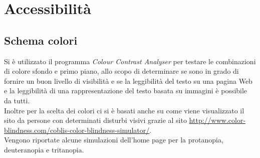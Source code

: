 \section{Accessibilità}
	\subsection{Schema colori}
	Si è utilizzato il programma \emph{Colour Contrast Analyser} per testare le combinazioni di colore sfondo e primo piano, allo scopo di determinare se sono in grado di fornire un buon livello di visibilità e se la leggibilità del testo su una pagina Web e la leggibilità di una rappresentazione del testo basata su immagini è possibile da tutti.\\
	Inoltre per la scelta dei colori ci si è basati anche su come viene visualizzato il sito da persone con determinati disturbi visivi grazie al sito \url{http://www.color-blindness.com/coblis-color-blindness-simulator/}.\\
	Vengono riportate alcune simulazioni dell'home page per la protanopia, deuteranopia e tritanopia.\\
	
